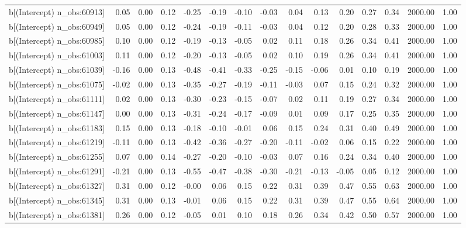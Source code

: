 \begin{table}[ht]
\begin{tabular}{rrrrrrrrrrrrrrr}
  b[(Intercept) n\_obs:60913] & 0.05 & 0.00 & 0.12 & -0.25 & -0.19 & -0.10 & -0.03 & 0.04 & 0.13 & 0.20 & 0.27 & 0.34 & 2000.00 & 1.00 \\ 
  b[(Intercept) n\_obs:60949] & 0.05 & 0.00 & 0.12 & -0.24 & -0.19 & -0.11 & -0.03 & 0.04 & 0.12 & 0.20 & 0.28 & 0.33 & 2000.00 & 1.00 \\ 
  b[(Intercept) n\_obs:60985] & 0.10 & 0.00 & 0.12 & -0.19 & -0.13 & -0.05 & 0.02 & 0.11 & 0.18 & 0.26 & 0.34 & 0.41 & 2000.00 & 1.00 \\ 
  b[(Intercept) n\_obs:61003] & 0.11 & 0.00 & 0.12 & -0.20 & -0.13 & -0.05 & 0.02 & 0.10 & 0.19 & 0.26 & 0.34 & 0.41 & 2000.00 & 1.00 \\ 
  b[(Intercept) n\_obs:61039] & -0.16 & 0.00 & 0.13 & -0.48 & -0.41 & -0.33 & -0.25 & -0.15 & -0.06 & 0.01 & 0.10 & 0.19 & 2000.00 & 1.00 \\ 
  b[(Intercept) n\_obs:61075] & -0.02 & 0.00 & 0.13 & -0.35 & -0.27 & -0.19 & -0.11 & -0.03 & 0.07 & 0.15 & 0.24 & 0.32 & 2000.00 & 1.00 \\ 
  b[(Intercept) n\_obs:61111] & 0.02 & 0.00 & 0.13 & -0.30 & -0.23 & -0.15 & -0.07 & 0.02 & 0.11 & 0.19 & 0.27 & 0.34 & 2000.00 & 1.00 \\ 
  b[(Intercept) n\_obs:61147] & 0.00 & 0.00 & 0.13 & -0.31 & -0.24 & -0.17 & -0.09 & 0.01 & 0.09 & 0.17 & 0.25 & 0.35 & 2000.00 & 1.00 \\ 
  b[(Intercept) n\_obs:61183] & 0.15 & 0.00 & 0.13 & -0.18 & -0.10 & -0.01 & 0.06 & 0.15 & 0.24 & 0.31 & 0.40 & 0.49 & 2000.00 & 1.00 \\ 
  b[(Intercept) n\_obs:61219] & -0.11 & 0.00 & 0.13 & -0.42 & -0.36 & -0.27 & -0.20 & -0.11 & -0.02 & 0.06 & 0.15 & 0.22 & 2000.00 & 1.00 \\ 
  b[(Intercept) n\_obs:61255] & 0.07 & 0.00 & 0.14 & -0.27 & -0.20 & -0.10 & -0.03 & 0.07 & 0.16 & 0.24 & 0.34 & 0.40 & 2000.00 & 1.00 \\ 
  b[(Intercept) n\_obs:61291] & -0.21 & 0.00 & 0.13 & -0.55 & -0.47 & -0.38 & -0.30 & -0.21 & -0.13 & -0.05 & 0.05 & 0.12 & 2000.00 & 1.00 \\ 
  b[(Intercept) n\_obs:61327] & 0.31 & 0.00 & 0.12 & -0.00 & 0.06 & 0.15 & 0.22 & 0.31 & 0.39 & 0.47 & 0.55 & 0.63 & 2000.00 & 1.00 \\ 
  b[(Intercept) n\_obs:61345] & 0.31 & 0.00 & 0.13 & -0.01 & 0.06 & 0.15 & 0.22 & 0.31 & 0.39 & 0.47 & 0.55 & 0.64 & 2000.00 & 1.00 \\ 
  b[(Intercept) n\_obs:61381] & 0.26 & 0.00 & 0.12 & -0.05 & 0.01 & 0.10 & 0.18 & 0.26 & 0.34 & 0.42 & 0.50 & 0.57 & 2000.00 & 1.00 \\ 

\end{tabular}
\end{table}
